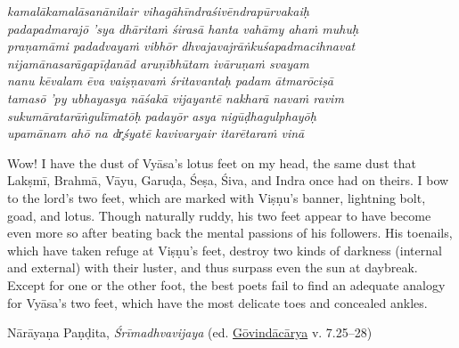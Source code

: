\begin{pullquote}\raggedright
      \emph{kamalākamalāsanānilair vihagāhīndraśivēndrapūrvakaiḥ}\\
\emph{padapadmarajō ’sya dhāritaṁ śirasā hanta vahāmy ahaṁ muhuḥ}\\
\emph{praṇamāmi padadvayaṁ vibhōr dhvajavajrāṅkuśapadmacihnavat}\\
\emph{nijamānasarāgapīḍanād aruṇībhūtam ivāruṇaṁ svayam}\\
\emph{nanu kēvalam ēva vaiṣṇavaṁ śritavantaḥ padam ātmarōciṣā}\\
\emph{tamasō ’py ubhayasya nāśakā vijayantē nakharā navaṁ ravim}\\
\emph{sukumāratarāṅgulīmatōḥ padayōr asya nigūḍhagulphayōḥ}\\
\emph{upamānam ahō na dr̥śyatē kavivaryair itarētaraṁ vinā}
\end{pullquote}
      
\begin{pullquote}
Wow! I have the dust of Vyāsa’s lotus feet on my head, the same dust that Lakṣmī, Brahmā, Vāyu, Garuḍa, Śeṣa, Śiva, and Indra once had on theirs. I bow to the lord’s two feet, which are marked with Viṣṇu’s banner, lightning bolt, goad, and lotus. Though naturally ruddy, his two feet appear to have become even more so after beating back the mental passions of his followers. His toenails, which have taken refuge at Viṣṇu’s feet, destroy two kinds of darkness (internal and external) with their luster, and thus surpass even the sun at daybreak. Except for one or the other foot, the best poets fail to find an adequate analogy for Vyāsa’s two feet, which have the most delicate toes and concealed ankles.\footnotemark{}


\medskip\hfill\begin{minipage}{0.9\textwidth}\small\hfill
Nārāyaṇa Paṇḍita, \emph{{Śrīmadhvavijaya}} (ed. \hyperref[NarayanaPandita2017]{Gōvindācārya} v. 7.25–28)\end{minipage}\hspace{2em}
\end{pullquote}

